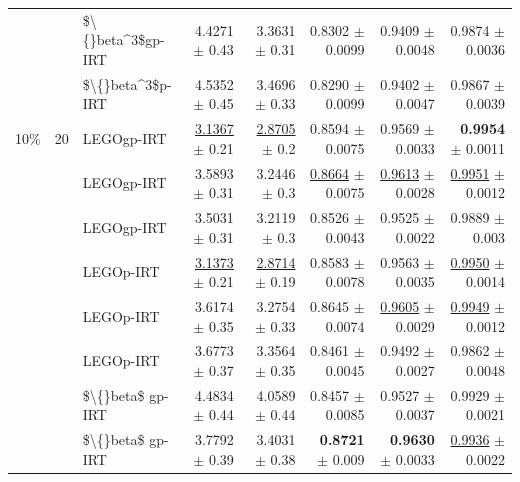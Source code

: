 \begin{longtable}{llp{}rrrrr}
 &  & \$\textbackslash\{\}beta\textasciicircum{}3\$gp-IRT & 4.4271 {\scriptsize $\pm$ 0.43} & 3.3631 {\scriptsize $\pm$ 0.31} & 0.8302 {\scriptsize $\pm$ 0.0099} & 0.9409 {\scriptsize $\pm$ 0.0048} & 0.9874 {\scriptsize $\pm$ 0.0036} \\
 &  & \$\textbackslash\{\}beta\textasciicircum{}3\$p-IRT & 4.5352 {\scriptsize $\pm$ 0.45} & 3.4696 {\scriptsize $\pm$ 0.33} & 0.8290 {\scriptsize $\pm$ 0.0099} & 0.9402 {\scriptsize $\pm$ 0.0047} & 0.9867 {\scriptsize $\pm$ 0.0039} \\
\midrule
10\% & 20 & LEGOgp-IRT & \underline{3.1367} {\scriptsize $\pm$ 0.21} & \underline{2.8705} {\scriptsize $\pm$ 0.2} & 0.8594 {\scriptsize $\pm$ 0.0075} & 0.9569 {\scriptsize $\pm$ 0.0033} & \textbf{0.9954} {\scriptsize $\pm$ 0.0011} \\
 &  & LEGOgp-IRT & 3.5893 {\scriptsize $\pm$ 0.31} & 3.2446 {\scriptsize $\pm$ 0.3} & \underline{0.8664} {\scriptsize $\pm$ 0.0075} & \underline{0.9613} {\scriptsize $\pm$ 0.0028} & \underline{0.9951} {\scriptsize $\pm$ 0.0012} \\
 &  & LEGOgp-IRT & 3.5031 {\scriptsize $\pm$ 0.31} & 3.2119 {\scriptsize $\pm$ 0.3} & 0.8526 {\scriptsize $\pm$ 0.0043} & 0.9525 {\scriptsize $\pm$ 0.0022} & 0.9889 {\scriptsize $\pm$ 0.003} \\
 &  & LEGOp-IRT & \underline{3.1373} {\scriptsize $\pm$ 0.21} & \underline{2.8714} {\scriptsize $\pm$ 0.19} & 0.8583 {\scriptsize $\pm$ 0.0078} & 0.9563 {\scriptsize $\pm$ 0.0035} & \underline{0.9950} {\scriptsize $\pm$ 0.0014} \\
 &  & LEGOp-IRT & 3.6174 {\scriptsize $\pm$ 0.35} & 3.2754 {\scriptsize $\pm$ 0.33} & 0.8645 {\scriptsize $\pm$ 0.0074} & \underline{0.9605} {\scriptsize $\pm$ 0.0029} & \underline{0.9949} {\scriptsize $\pm$ 0.0012} \\
 &  & LEGOp-IRT & 3.6773 {\scriptsize $\pm$ 0.37} & 3.3564 {\scriptsize $\pm$ 0.35} & 0.8461 {\scriptsize $\pm$ 0.0045} & 0.9492 {\scriptsize $\pm$ 0.0027} & 0.9862 {\scriptsize $\pm$ 0.0048} \\
 &  & \$\textbackslash\{\}beta\$ gp-IRT & 4.4834 {\scriptsize $\pm$ 0.44} & 4.0589 {\scriptsize $\pm$ 0.44} & 0.8457 {\scriptsize $\pm$ 0.0085} & 0.9527 {\scriptsize $\pm$ 0.0037} & 0.9929 {\scriptsize $\pm$ 0.0021} \\
 &  & \$\textbackslash\{\}beta\$ gp-IRT & 3.7792 {\scriptsize $\pm$ 0.39} & 3.4031 {\scriptsize $\pm$ 0.38} & \textbf{0.8721} {\scriptsize $\pm$ 0.009} & \textbf{0.9630} {\scriptsize $\pm$ 0.0033} & \underline{0.9936} {\scriptsize $\pm$ 0.0022} \\

\end{longtable}
